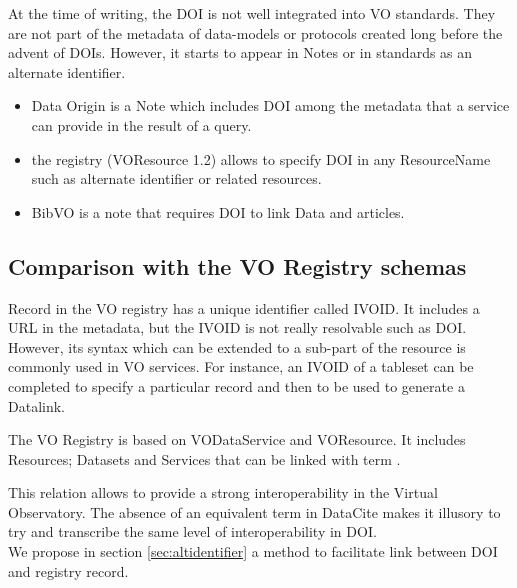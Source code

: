 \documentclass[11pt,a4paper]{ivoa}
\newcommand{\dataciteterm}[1]{\colorbox{lightgray}{DataCite:\textbf{#1}}}
\begin{document}
At the time of writing, the DOI is not well integrated into VO standards. They are not part of the metadata of data-models or protocols created long before the advent of DOIs.
However, it starts to appear in Notes or in standards as an alternate identifier.


\begin {itemize}
\item Data Origin \citep{note:dataorigin} is a Note which includes DOI among the metadata that a service can provide in the result of a query.
\item the registry \citep{std:registry} (VOResource 1.2) allows to specify DOI in any ResourceName such as alternate identifier or related resources.
\item BibVO \citep{note:bibvo} is a note that requires DOI to link Data and articles.
\end{itemize}


\subsection{Comparison with the VO Registry schemas}
 Record in the VO registry has a unique identifier called IVOID. It includes a URL in the metadata, but the IVOID is not really resolvable such as DOI. However, its syntax which can be extended to a sub-part of the resource is commonly used in VO services. For instance, an IVOID of a tableset can be completed to specify a particular record and then to be used to generate a Datalink.
 
 The VO Registry is  based on VODataService and VOResource. It includes Resources; Datasets and Services that can be linked with term . 
 
 This relation allows to provide a strong interoperability in the Virtual Observatory. The absence of an equivalent term in DataCite makes it illusory to try and transcribe the same level of interoperability in DOI.\\
 
 
 
 We propose in section \ref{sec:altidentifier} a method to facilitate link between DOI and registry record.\\
 
\end{document}

